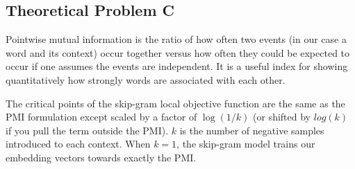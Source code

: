 \subsection*{Theoretical Problem C}
Pointwise mutual information is the ratio of how often two events (in our case a word and its context) occur together versus how often they could be expected to occur if one assumes the events are independent. It is a useful index for showing quantitatively how strongly words are associated with each other.

The critical points of the skip-gram local objective function are the same as the PMI formulation except scaled by a factor of $\log(1/k)$ (or shifted by $log(k)$ if you pull the term outside the PMI). $k$ is the number of negative samples introduced to each context. When $k=1$, the skip-gram model trains our embedding vectors towards exactly the PMI.


